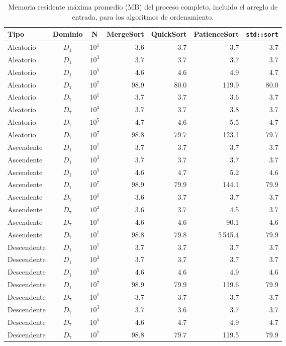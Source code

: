 \begin{table}[htbp]
\centering
\caption{Memoria residente máxima promedio (MB) del proceso completo, incluido el arreglo de entrada, para los algoritmos de ordenamiento.}
\vspace{0.2cm}
\small
\begin{tabular}{|l|c|c|r|r|r|r|}
\hline
\textbf{Tipo} & \textbf{Dominio} & \textbf{N} & \textbf{MergeSort} & \textbf{QuickSort} & \textbf{PatienceSort} & \textbf{\texttt{std::sort}} \\ \hline
Aleatorio & $D_{1}$ & $10^{1}$ & 3.6 & 3.7 & 3.7 & 3.7 \\ \hline
Aleatorio & $D_{1}$ & $10^{3}$ & 3.7 & 3.7 & 3.7 & 3.7 \\ \hline
Aleatorio & $D_{1}$ & $10^{5}$ & 4.6 & 4.6 & 4.9 & 4.7 \\ \hline
Aleatorio & $D_{1}$ & $10^{7}$ & 98.9 & 80.0 & 119.9 & 80.0 \\ \hline
Aleatorio & $D_{7}$ & $10^{1}$ & 3.7 & 3.7 & 3.6 & 3.7 \\ \hline
Aleatorio & $D_{7}$ & $10^{3}$ & 3.7 & 3.7 & 3.8 & 3.7 \\ \hline
Aleatorio & $D_{7}$ & $10^{5}$ & 4.7 & 4.6 & 5.5 & 4.7 \\ \hline
Aleatorio & $D_{7}$ & $10^{7}$ & 98.8 & 79.7 & 123.1 & 79.7 \\ \hline
Ascendente & $D_{1}$ & $10^{1}$ & 3.7 & 3.7 & 3.7 & 3.7 \\ \hline
Ascendente & $D_{1}$ & $10^{3}$ & 3.7 & 3.7 & 3.7 & 3.7 \\ \hline
Ascendente & $D_{1}$ & $10^{5}$ & 4.6 & 4.7 & 5.2 & 4.6 \\ \hline
Ascendente & $D_{1}$ & $10^{7}$ & 98.9 & 79.9 & 144.1 & 79.9 \\ \hline
Ascendente & $D_{7}$ & $10^{1}$ & 3.6 & 3.7 & 3.7 & 3.7 \\ \hline
Ascendente & $D_{7}$ & $10^{3}$ & 3.6 & 3.7 & 4.5 & 3.7 \\ \hline
Ascendente & $D_{7}$ & $10^{5}$ & 4.6 & 4.6 & 90.1 & 4.6 \\ \hline
Ascendente & $D_{7}$ & $10^{7}$ & 98.8 & 79.8 & 5\,545.4 & 79.9 \\ \hline
Descendente & $D_{1}$ & $10^{1}$ & 3.7 & 3.7 & 3.7 & 3.7 \\ \hline
Descendente & $D_{1}$ & $10^{3}$ & 3.7 & 3.7 & 3.7 & 3.7 \\ \hline
Descendente & $D_{1}$ & $10^{5}$ & 4.6 & 4.6 & 4.9 & 4.6 \\ \hline
Descendente & $D_{1}$ & $10^{7}$ & 98.9 & 79.9 & 119.6 & 79.9 \\ \hline
Descendente & $D_{7}$ & $10^{1}$ & 3.7 & 3.7 & 3.7 & 3.7 \\ \hline
Descendente & $D_{7}$ & $10^{3}$ & 3.7 & 3.6 & 3.7 & 3.7 \\ \hline
Descendente & $D_{7}$ & $10^{5}$ & 4.6 & 4.7 & 4.9 & 4.7 \\ \hline
Descendente & $D_{7}$ & $10^{7}$ & 98.8 & 79.7 & 119.5 & 79.9 \\ \hline
\end{tabular}
\label{tab:sorting_memoria}
\end{table}

